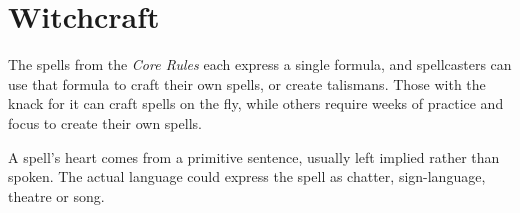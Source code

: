 \chapter{Witchcraft}

The spells from the \textit{Core Rules} each express a single formula, and spellcasters can use that formula to craft their own spells, or create \glspl{talisman}.
Those with the knack for it can craft spells on the fly, while others require weeks of practice and focus to create their own spells.

A spell's heart comes from a primitive sentence, usually left implied rather than spoken.
The actual language could express the spell as chatter, sign-language, theatre or song.

\vspace{\baselineskip}

